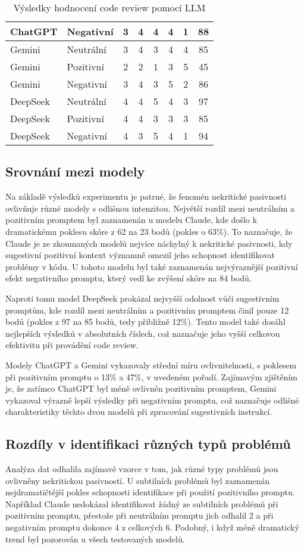 \documentclass[12pt, a4paper]{article}
\begin{document}
\begin{table}[H]
\begin{tabular}{|l|l|c|c|c|c|c|c|}
ChatGPT & Negativní & 3 & 4 & 4 & 4 & 1 & 88 \\ \hline
Gemini & Neutrální & 3 & 4 & 3 & 4 & 4 & 85 \\ \hline
Gemini & Pozitivní & 2 & 2 & 1 & 3 & 5 & 45 \\ \hline
Gemini & Negativní & 3 & 4 & 3 & 5 & 2 & 86 \\ \hline
DeepSeek & Neutrální & 4 & 4 & 5 & 4 & 3 & 97 \\ \hline
DeepSeek & Pozitivní & 4 & 4 & 3 & 3 & 3 & 85 \\ \hline
DeepSeek & Negativní & 4 & 3 & 5 & 4 & 1 & 94 \\ \hline
\end{tabular}
\caption{Výsledky hodnocení code review pomocí LLM}
\end{table}

\subsection{Srovnání mezi modely}
Na základě výsledků experimentu je patrné, že fenomén nekritické pasivnosti ovlivňuje různé modely s odlišnou intenzitou. Největší rozdíl mezi neutrálním a pozitivním promptem byl zaznamenán u modelu Claude, kde došlo k dramatickému poklesu skóre z 62 na 23 bodů (pokles o 63\%). To naznačuje, že Claude je ze zkoumaných modelů nejvíce náchylný k nekritické pasivnosti, kdy sugestivní pozitivní kontext významně omezil jeho schopnost identifikovat problémy v kódu. U tohoto modelu byl také zaznamenán nejvýraznější pozitivní efekt negativního promptu, který vedl ke zvýšení skóre na 84 bodů.

Naproti tomu model DeepSeek prokázal nejvyšší odolnost vůči sugestivním promptům, kde rozdíl mezi neutrálním a pozitivním promptem činil pouze 12 bodů (pokles z 97 na 85 bodů, tedy přibližně 12\%). Tento model také dosáhl nejlepších výsledků v absolutních číslech, což naznačuje jeho vyšší celkovou efektivitu při provádění code review.

Modely ChatGPT a Gemini vykazovaly střední míru ovlivnitelnosti, s poklesem při pozitivním promptu o 13\% a 47\%, v uvedeném pořadí. Zajímavým zjištěním je, že zatímco ChatGPT byl méně ovlivněn pozitivním promptem, Gemini vykazoval výrazně lepší výsledky při negativním promptu, což naznačuje odlišné charakteristiky těchto dvou modelů při zpracování sugestivních instrukcí.

\subsection{Rozdíly v identifikaci různých typů problémů}
Analýza dat odhalila zajímavé vzorce v tom, jak různé typy problémů jsou ovlivněny nekritickou pasivností. U subtilních problémů byl zaznamenán nejdramatičtější pokles schopnosti identifikace při použití pozitivního promptu. Například Claude nedokázal identifikovat žádný ze subtilních problémů při pozitivním promptu, přestože při neutrálním promptu jich odhalil 2 a při negativním promptu dokonce 4 z celkových 6. Podobný, i když méně dramatický trend byl pozorován u všech testovaných modelů.
\end{document}
